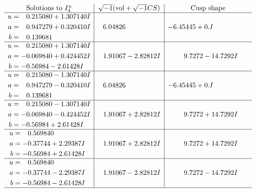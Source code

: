 \documentclass[1p]{elsarticle_modified}
\theoremstyle{definition}
\newcommand{\I}{\sqrt{-1}}
\begin{document}
$$\begin{array}{c|c|c}  
\text{Solutions to }I^u_{4}& \I (\text{vol} + \sqrt{-1}CS) & \text{Cusp shape}\\
 \hline 
\begin{aligned}
u &= \phantom{-}0.215080 + 1.307140 I \\
a &= \phantom{-}0.947279 + 0.320410 I \\
b &= \phantom{-}0.139681\phantom{ +0.000000I}\end{aligned}
 & \phantom{-}6.04826\phantom{ +0.000000I} & -6.45445 + 0. I\phantom{ +0.000000I} \\ \hline\begin{aligned}
u &= \phantom{-}0.215080 + 1.307140 I \\
a &= -0.069840 + 0.424452 I \\
b &= -0.56984 - 2.61428 I\end{aligned}
 & \phantom{-}1.91067 - 2.82812 I & \phantom{-}9.7272 - 14.7292 I \\ \hline\begin{aligned}
u &= \phantom{-}0.215080 - 1.307140 I \\
a &= \phantom{-}0.947279 - 0.320410 I \\
b &= \phantom{-}0.139681\phantom{ +0.000000I}\end{aligned}
 & \phantom{-}6.04826\phantom{ +0.000000I} & -6.45445 + 0. I\phantom{ +0.000000I} \\ \hline\begin{aligned}
u &= \phantom{-}0.215080 - 1.307140 I \\
a &= -0.069840 - 0.424452 I \\
b &= -0.56984 + 2.61428 I\end{aligned}
 & \phantom{-}1.91067 + 2.82812 I & \phantom{-}9.7272 + 14.7292 I \\ \hline\begin{aligned}
u &= \phantom{-}0.569840\phantom{ +0.000000I} \\
a &= -0.37744 + 2.29387 I \\
b &= -0.56984 + 2.61428 I\end{aligned}
 & \phantom{-}1.91067 + 2.82812 I & \phantom{-}9.7272 + 14.7292 I \\ \hline\begin{aligned}
u &= \phantom{-}0.569840\phantom{ +0.000000I} \\
a &= -0.37744 - 2.29387 I \\
b &= -0.56984 - 2.61428 I\end{aligned}
 & \phantom{-}1.91067 - 2.82812 I & \phantom{-}9.7272 - 14.7292 I\\
 \hline 
 \end{array}$$\newpage\newpage\renewcommand{\arraystretch}{1}
\end{document}
